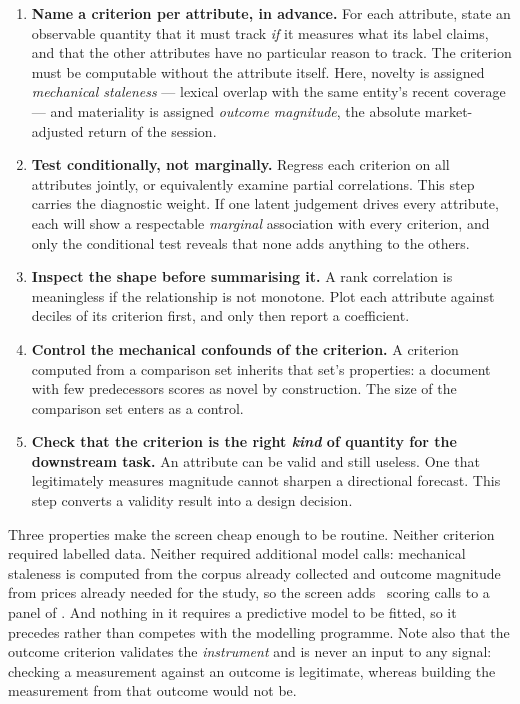 \documentclass[preprint,12pt,authoryear]{elsarticle}
\theoremstyle{plain}
\theoremstyle{remark}
\begin{document}
\begin{enumerate}
\item \textbf{Name a criterion per attribute, in advance.} For each attribute,
  state an observable quantity that it must track \emph{if} it measures what its
  label claims, and that the other attributes have no particular reason to
  track. The criterion must be computable without the attribute itself. Here,
  novelty is assigned \emph{mechanical staleness} --- lexical overlap with the
  same entity's recent coverage --- and materiality is assigned \emph{outcome
  magnitude}, the absolute market-adjusted return of the session.
\item \textbf{Test conditionally, not marginally.} Regress each criterion on all
  attributes jointly, or equivalently examine partial correlations. This step
  carries the diagnostic weight. If one latent judgement drives every attribute,
  each will show a respectable \emph{marginal} association with every criterion,
  and only the conditional test reveals that none adds anything to the others.
\item \textbf{Inspect the shape before summarising it.} A rank correlation is
  meaningless if the relationship is not monotone. Plot each attribute against
  deciles of its criterion first, and only then report a coefficient.
\item \textbf{Control the mechanical confounds of the criterion.} A criterion
  computed from a comparison set inherits that set's properties: a document with
  few predecessors scores as novel by construction. The size of the comparison
  set enters as a control.
\item \textbf{Check that the criterion is the right \emph{kind} of quantity for
  the downstream task.} An attribute can be valid and still useless. One that
  legitimately measures magnitude cannot sharpen a directional forecast. This
  step converts a validity result into a design decision.
\end{enumerate}

Three properties make the screen cheap enough to be routine. Neither criterion
required labelled data. Neither required additional model calls: mechanical
staleness is computed from the corpus already collected and outcome magnitude
from prices already needed for the study, so the screen adds
\ScreenModelCalls\ scoring calls to a panel of \ScoredHeadlines. And nothing in
it requires a predictive model to be fitted, so it precedes rather than competes
with the modelling programme. Note also that the outcome criterion validates the
\emph{instrument} and is never an input to any signal: checking a measurement
against an outcome is legitimate, whereas building the measurement from that
outcome would not be.
\end{document}
